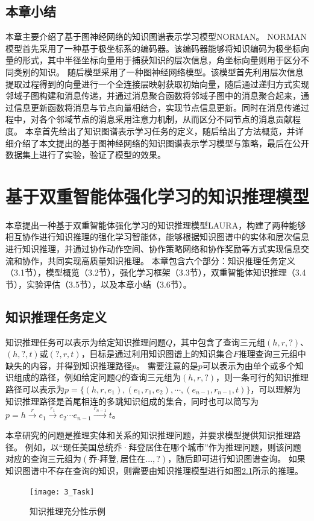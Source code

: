 \documentclass[algorithmlist, AutoFakeBold, AutoFakeSlant, figurelist, tablelist, nomlist, engineering]{seuthesix}
\begin{document}
\section{本章小结}
本章主要介绍了基于图神经网络的知识图谱表示学习模型NORMAN。
NORMAN模型首先采用了一种基于极坐标系的编码器。该编码器能够将知识编码为极坐标向量的形式，其中半径坐标向量用于捕获知识的层次信息，角坐标向量则用于区分不同类别的知识。
随后模型采用了一种图神经网络模型。该模型首先利用层次信息提取过程得到的向量进行一个全连接层映射获取初始向量，随后通过递归方式实现邻域子图构建和消息传递，并通过消息聚合函数将邻域子图中的消息聚合起来，通过信息更新函数将消息与节点向量相结合，实现节点信息更新。同时在消息传递过程中，对各个邻域节点的消息采用注意力机制，从而区分不同节点的消息贡献程度。
本章首先给出了知识图谱表示学习任务的定义，随后给出了方法概览，并详细介绍了本文提出的基于图神经网络的知识图谱表示学习模型与策略，最后在公开数据集上进行了实验，验证了模型的效果。


\chapter{基于双重智能体强化学习的知识推理模型}
本章提出一种基于双重智能体强化学习的知识推理模型LAURA，构建了两种能够相互协作进行知识推理的强化学习智能体，能够根据知识图谱中的实体和层次信息进行知识推理，并通过协作动作空间、协作策略网络和协作奖励等方式实现信息交流和协作，共同实现高质量知识推理。
本章包含六个部分：知识推理任务定义（3.1节），模型概览（3.2节），强化学习框架（3.3节），双重智能体知识推理（3.4节），实验评估（3.5节），以及本章小结（3.6节）。

\section{知识推理任务定义}
知识推理任务可以表示为给定知识推理问题$Q$，其中包含了查询三元组$(h, r, ?)$、$(h, ?, t)$或$(?, r, t)$，目标是通过利用知识图谱上的知识集合$F$推理查询三元组中缺失的内容，并得到知识推理路径$p$。
需要注意的是$p$可以表示为由单个或多个知识组成的路径，例如给定问题$Q$的查询三元组为$(h, r, ?)$，则一条可行的知识推理路径可以表示为$p=\{(h, r, e_1), (e_1, r_1, e_2), \cdots, (e_{n-1}, r_{n-1}, t)\}$，可以理解为知识推理路径是首尾相连的多跳知识组成的集合，同时也可以简写为$p=h\xrightarrow{r}e_1\xrightarrow{r_1}e_2 \cdots e_{n-1}\xrightarrow{r_{n-1}}t$。

本章研究的问题是推理实体和关系的知识推理问题，并要求模型提供知识推理路径。
例如，以“现任美国总统乔·拜登居住在哪个城市”作为推理问题，则该问题对应的查询三元组为$(\mbox{乔·拜登}, \mbox{居住在...}, ?)$，随后即可进行知识图谱查询。
如果知识图谱中不存在查询的知识，则需要由知识推理模型进行如图\ref{3_Task}所示的推理。
\begin{figure}[ht]
  \centering
  \texttt{[image: 3\_Task]}
  \caption{知识推理充分性示例}
  \label{3_Task}
\end{figure}
\end{document}
